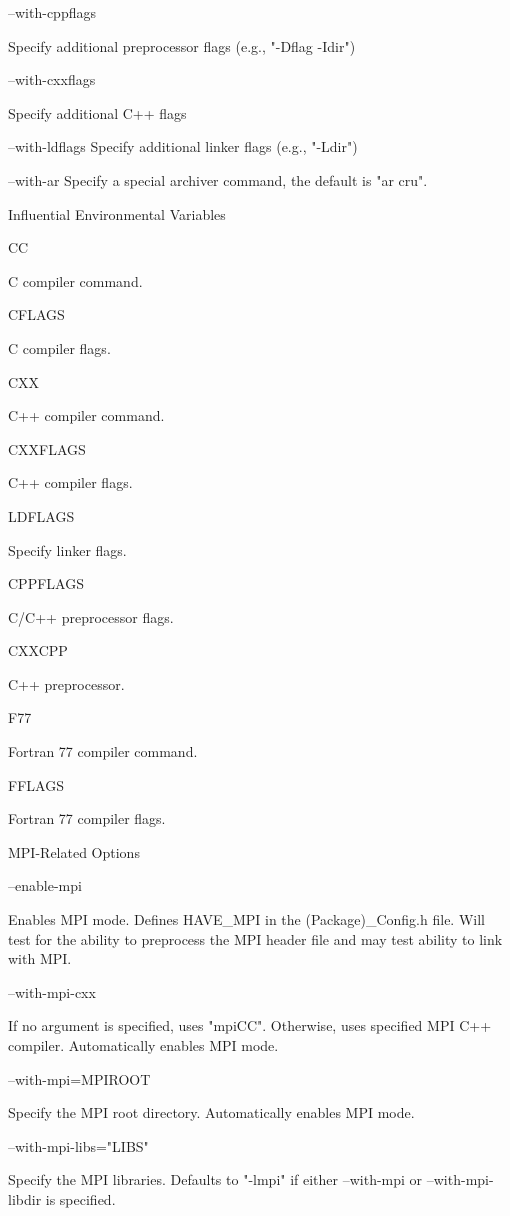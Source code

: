 \documentclass[12pt,relax]{TrilinosDevGuide}
\begin{document}
\bullet --with-cppflags 

Specify additional preprocessor flags (e.g., "-Dflag -Idir") 

\bullet --with-cxxflags 

Specify additional C++ flags 

\bullet --with-ldflags 
Specify additional linker flags (e.g., "-Ldir") 

\bullet --with-ar 
Specify a special archiver command, the default is "ar cru". 

\triangleright Influential Environmental Variables

\bullet CC 

C compiler command.

\bullet CFLAGS 

C compiler flags.

\bullet CXX 

C++ compiler command.

\bullet CXXFLAGS 

C++ compiler flags.

\bullet LDFLAGS 

Specify linker flags.

\bullet CPPFLAGS 

C/C++ preprocessor flags.

\bullet CXXCPP 

C++ preprocessor.

\bullet F77 

Fortran 77 compiler command.

\bullet FFLAGS 

Fortran 77 compiler flags.

\triangleright MPI-Related Options

\bullet --enable-mpi 

Enables MPI mode. Defines HAVE_MPI in the (Package)_Config.h file. Will test 
for the ability to preprocess the MPI header file and may test ability to link 
with MPI.

\bullet --with-mpi-cxx 

If no argument is specified, uses "mpiCC". Otherwise, uses specified MPI C++
compiler. Automatically enables MPI mode. 

\bullet --with-mpi=MPIROOT 

Specify the MPI root directory. Automatically enables MPI mode. 

\bullet --with-mpi-libs="LIBS" 

Specify the MPI libraries. Defaults to "-lmpi" if either --with-mpi or 
--with-mpi-libdir is specified.
\end{document}
